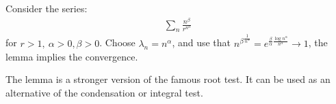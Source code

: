 \documentclass{article}
\begin{document}
\vspace{0.2cm}
\par\noindent Consider the series:
\begin{gather*}
\sum_n \frac{n^\beta}{r^{n^\alpha}}
\end{gather*}
for $r>1,\ \alpha>0, \beta>0$. Choose $\lambda_n=n^\alpha$, and use that ${n^\beta}^{\frac{1}{n^\alpha}}=e^{\frac{\beta}{\alpha} \frac{\log{n^\alpha}}{n^\alpha}}\to 1$, 
the lemma implies the convergence.


\vspace{0.2cm}
\par\noindent The lemma is a stronger version of the famous root test. It can be used as an alternative of the condensation or integral test.
\end{document}
